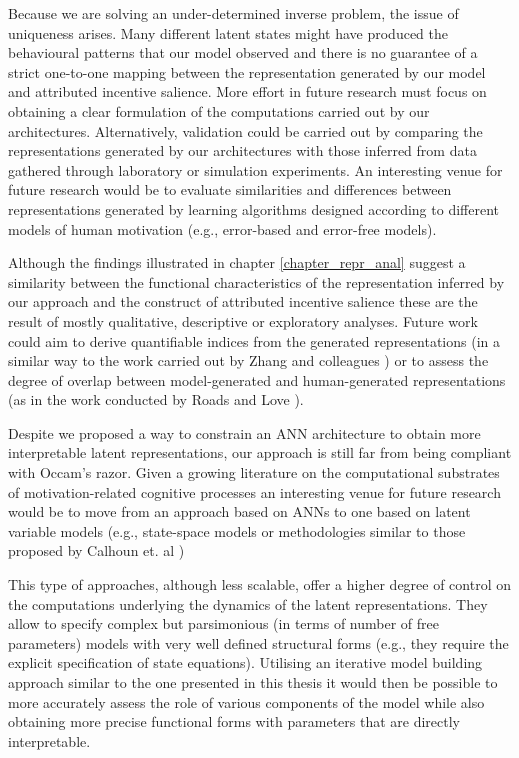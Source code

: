 Because we are solving an under-determined inverse problem, the issue of uniqueness arises. Many different latent states might have produced the behavioural patterns that our model observed and there is no guarantee of a strict one-to-one mapping between the representation generated by our model and attributed incentive salience.  More effort in future research must focus on obtaining a clear formulation of the computations carried out by our architectures. Alternatively, validation could be carried out by comparing the representations generated by our architectures with those inferred from data gathered through laboratory or simulation experiments. An interesting venue for future research would be to evaluate similarities and differences between representations generated by learning algorithms designed according to different models of human motivation (e.g., error-based \cite{schultz1997neural} and error-free \cite{friston2012active} models).

Although the findings illustrated in chapter \ref{chapter_repr_anal} suggest a similarity between the functional characteristics of the representation inferred by our approach and the construct of attributed incentive salience these are the result of mostly qualitative, descriptive or exploratory analyses. Future work could aim to derive quantifiable indices from the generated representations (in a similar way to the work carried out by Zhang and colleagues \cite{zhang2009neural}) or to assess the degree of overlap between model-generated and human-generated representations (as in the work conducted by Roads and Love \cite{roads2021enriching}).

Despite we proposed a way to constrain an ANN architecture to obtain more interpretable latent representations, our approach is still far from being compliant with Occam's razor. Given a growing literature on the computational substrates of motivation-related cognitive processes \cite{schultz1997neural, mcclure2003computational, zhang2009neural, wang2018prefrontal} an interesting venue for future research would be to move from an approach based on ANNs to one based on latent variable models (e.g., state-space models or methodologies similar to those proposed by Calhoun et. al \cite{calhoun2019unsupervised})

This type of approaches, although less scalable, offer a higher degree of control on the computations underlying the dynamics of the latent representations. They allow to specify complex but parsimonious (in terms of number of free parameters) models with very well defined structural forms (e.g., they require the explicit specification of state equations). Utilising an iterative model building approach similar to the one presented in this thesis it would then be possible to more accurately assess the role of various components of the model while also obtaining more precise functional forms with parameters that are directly interpretable.

